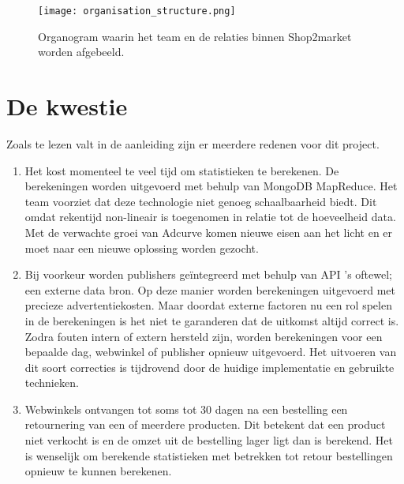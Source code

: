 \begin{figure}[h]
    \texttt{[image: organisation\_structure.png]}
    \caption{Organogram waarin het team en de relaties binnen Shop2market worden afgebeeld.}
    \label{fig:orgchart}
\end{figure}

\clearpage

\section{De kwestie} %

Zoals te lezen valt in de aanleiding zijn er meerdere redenen voor dit project.

\begin{enumerate}
    \item Het kost momenteel te veel tijd om statistieken te berekenen. De berekeningen worden uitgevoerd met behulp van MongoDB MapReduce. Het team voorziet dat deze technologie niet genoeg schaalbaarheid biedt. Dit omdat rekentijd non-lineair is toegenomen in relatie tot de hoeveelheid data. Met de verwachte groei van Adcurve komen nieuwe eisen aan het licht en er moet naar een nieuwe oplossing worden gezocht.
    \item Bij voorkeur worden publishers geïntegreerd met behulp van API 's oftewel; een externe data bron. Op deze manier worden berekeningen uitgevoerd met precieze advertentiekosten. Maar doordat externe factoren nu een rol spelen in de berekeningen is het niet te garanderen dat de uitkomst altijd correct is. Zodra fouten intern of extern hersteld zijn, worden berekeningen voor een bepaalde dag, webwinkel of publisher opnieuw uitgevoerd. Het uitvoeren van dit soort correcties is tijdrovend door de huidige implementatie en gebruikte technieken.
    \item Webwinkels ontvangen tot soms tot 30 dagen na een bestelling een retournering van een of meerdere producten. Dit betekent dat een product niet verkocht is en de omzet uit de bestelling lager ligt dan is berekend. Het is wenselijk om berekende statistieken met betrekken tot retour bestellingen opnieuw te kunnen berekenen.
\end{enumerate}
